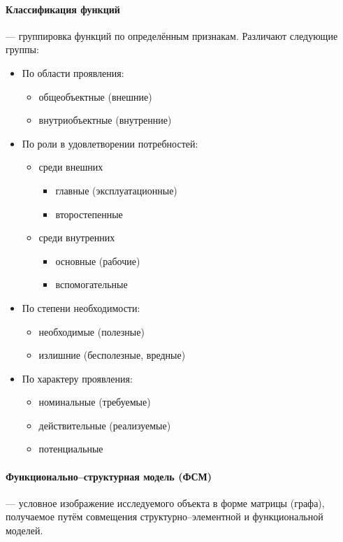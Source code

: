 \paragraph{Классификация функций} --- группировка функций по определённым
признакам.
Различают следующие группы:
\begin{itemize}
    \item По области проявления:
        \begin{itemize}
            \item общеобъектные (внешние)
            \item внутриобъектные (внутренние)
        \end{itemize}
    \item По роли в удовлетворении потребностей:
        \begin{itemize}
            \item среди внешних
                \begin{itemize}
                    \item главные (эксплуатационные)
                    \item второстепенные
                \end{itemize}
            \item среди внутренних
                \begin{itemize}
                    \item основные (рабочие)
                    \item вспомогательные
                \end{itemize}
        \end{itemize}
    \item По степени необходимости:
        \begin{itemize}
            \item необходимые (полезные)
            \item излишние (бесполезные, вредные)
        \end{itemize}
    \item По характеру проявления:
        \begin{itemize}
            \item номинальные (требуемые)
            \item действительные (реализуемые)
            \item потенциальные
        \end{itemize}
\end{itemize}

\paragraph{Функционально--структурная модель (ФСМ)}
--- условное изображение исследуемого объекта в форме матрицы (графа),
получаемое путём совмещения структурно--элементной и функциональной моделей.

